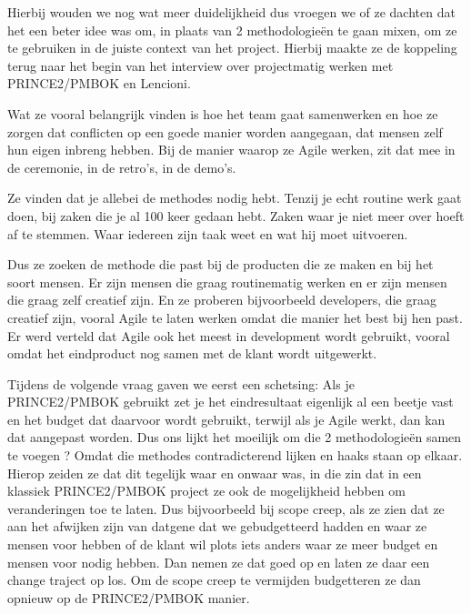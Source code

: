 \documentclass[dutch]{hogent-article}
\begin{document}
Hierbij wouden we nog wat meer duidelijkheid dus vroegen we of ze dachten dat het een beter idee was om, in plaats van 2 methodologieën te gaan mixen, om ze te gebruiken in de juiste context van het project. Hierbij maakte ze de koppeling terug naar het begin van het interview over projectmatig werken met PRINCE2/PMBOK en Lencioni. 
\newline

Wat ze vooral belangrijk vinden is hoe het team gaat samenwerken en hoe ze zorgen dat conflicten op een goede manier worden aangegaan, dat mensen zelf hun eigen inbreng hebben. Bij de manier waarop ze Agile werken, zit dat mee in de ceremonie, in de retro’s, in de demo’s. 
\newline

Ze vinden dat je allebei de methodes nodig hebt. Tenzij je echt routine werk gaat doen, bij zaken die je al 100 keer gedaan hebt. Zaken waar je niet meer over hoeft af te stemmen. Waar iedereen zijn taak weet en wat hij moet uitvoeren.
\newline

Dus ze zoeken de methode die past bij de producten die ze maken en bij het soort mensen. Er zijn mensen die graag routinematig werken en er zijn mensen die graag zelf creatief zijn. En ze proberen bijvoorbeeld developers, die graag creatief zijn, vooral Agile te laten werken omdat die manier het best bij hen past. Er werd verteld dat Agile ook het meest in development wordt gebruikt, vooral omdat het eindproduct nog samen met de klant wordt uitgewerkt. 
\newline

Tijdens de volgende vraag gaven we eerst een schetsing: Als je PRINCE2/PMBOK gebruikt zet je het eindresultaat eigenlijk al een beetje vast en het budget dat daarvoor wordt gebruikt, terwijl als je Agile werkt, dan kan dat aangepast worden. Dus ons lijkt het moeilijk om die 2 methodologieën samen te voegen ? Omdat die methodes contradicterend lijken en haaks staan op elkaar. Hierop zeiden ze dat dit tegelijk waar en onwaar was, in die zin dat in een klassiek PRINCE2/PMBOK project ze ook de mogelijkheid hebben om veranderingen toe te laten. Dus bijvoorbeeld bij scope creep, als ze zien dat ze aan het afwijken zijn van datgene dat we gebudgetteerd hadden en waar ze mensen voor hebben of de klant wil plots iets anders waar ze meer budget en mensen voor nodig hebben. Dan nemen ze dat goed op en  laten ze daar een change traject op los. Om de scope creep te vermijden budgetteren ze dan opnieuw op de PRINCE2/PMBOK manier. 
\newline
\end{document}
